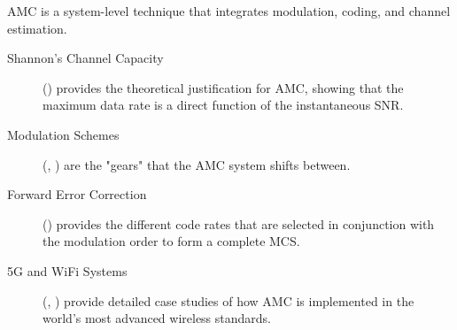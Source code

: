 \begin{importantbox}[title={Further Reading}]
    AMC is a system-level technique that integrates modulation, coding, and channel estimation.
    \begin{description}
        \item[Shannon's Channel Capacity] () provides the theoretical justification for AMC, showing that the maximum data rate is a direct function of the instantaneous SNR.
        \item[Modulation Schemes] (, ) are the "gears" that the AMC system shifts between.
        \item[Forward Error Correction] () provides the different code rates that are selected in conjunction with the modulation order to form a complete MCS.
        \item[5G and WiFi Systems] (, ) provide detailed case studies of how AMC is implemented in the world's most advanced wireless standards.
    \end{description}
\end{importantbox}
